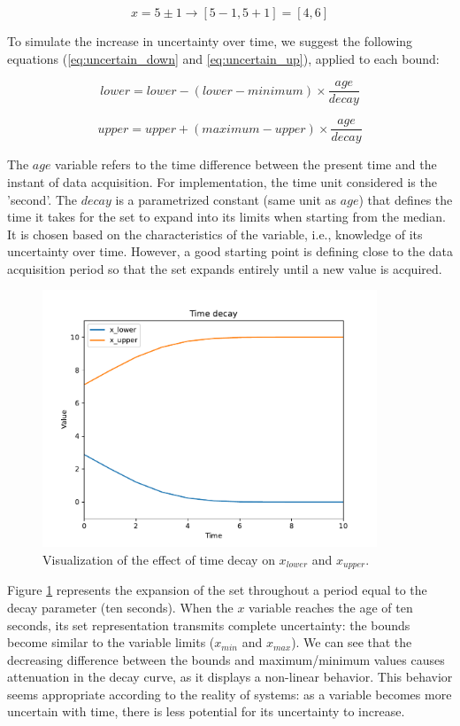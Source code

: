 $$x = 5 \pm 1 \rightarrow [5-1, 5+1] = [4, 6]$$

To simulate the increase in uncertainty over time, we suggest the following equations (\ref{eq:uncertain_down} and \ref{eq:uncertain_up}), applied to each bound:

\begin{equation} \label{eq:uncertain_down}
lower = lower - (lower - minimum) \times \frac{age}{decay}
\end{equation}

\begin{equation} \label{eq:uncertain_up}
upper = upper + (maximum - upper) \times \frac{age}{decay}
\end{equation}

The $age$ variable refers to the time difference between the present time and the instant of data acquisition. For implementation, the time unit considered is the 'second'. The $decay$ is a parametrized constant (same unit as $age$) that defines the time it takes for the set to expand into its limits when starting from the median. It is chosen based on the characteristics of the variable, i.e., knowledge of its uncertainty over time. However, a good starting point is defining close to the data acquisition period so that the set expands entirely until a new value is acquired.

\begin{figure}[h!]
    \centering
    \includegraphics[width=10cm]{figures/chapter4/cell/time_decay.pdf}
    \caption{Visualization of the effect of time decay on $x_{lower}$ and $x_{upper}$.}
    \label{fig:timedecay}
\end{figure}

Figure \ref{fig:timedecay} represents the expansion of the set throughout a period equal to the decay parameter (ten seconds). When the $x$ variable reaches the age of ten seconds, its set representation transmits complete uncertainty: the bounds become similar to the variable limits ($x_{min}$ and $x_{max}$). We can see that the decreasing difference between the bounds and maximum/minimum values causes attenuation in the decay curve, as it displays a non-linear behavior. This behavior seems appropriate according to the reality of systems: as a variable becomes more uncertain with time, there is less potential for its uncertainty to increase.



